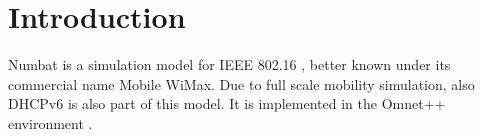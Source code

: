 \section{Introduction}

Numbat is a simulation model for IEEE 802.16 \cite{802.16e}, better
known under its commercial name Mobile WiMax. Due to full scale
mobility simulation, also DHCPv6 is also part of this model. It is
implemented in the Omnet++ environment \cite{omnet}.
